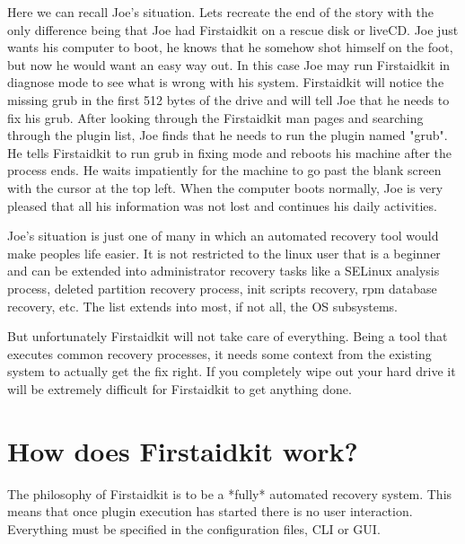 \documentclass[a4paper,13pt]{article}
\begin{document}
Here we can recall Joe's situation.  Lets recreate the end of the story with the only difference being that Joe had Firstaidkit on a rescue disk or liveCD.  Joe just wants his computer to boot, he knows that he somehow shot himself on the foot, but now he would want an easy way out.  In this case Joe may run Firstaidkit in diagnose mode to see what is wrong with his system.  Firstaidkit will notice the missing grub in the first 512 bytes of the drive and will tell Joe that he needs to fix his grub.  After looking through the Firstaidkit man pages and searching through the plugin list, Joe finds that he needs to run the plugin named "grub".  He tells Firstaidkit to run grub in fixing mode and reboots his machine after the process ends.  He waits impatiently for the machine to go past the blank screen with the cursor at the top left.  When the computer boots normally, Joe is very pleased that all his information was not lost and continues his daily activities.

Joe's situation is just one of many in which an automated recovery tool would make peoples life easier.  It is not restricted to the linux user that is a beginner and can be extended into administrator recovery tasks like a SELinux analysis process, deleted partition recovery process, init scripts recovery, rpm database recovery, etc.  The list extends into most, if not all, the OS subsystems.

But unfortunately Firstaidkit will not take care of everything.  Being a tool that executes common recovery processes, it needs some context from the existing system to actually get the fix right.  If you completely wipe out your hard drive it will be extremely difficult for Firstaidkit to get anything done.

\section{How does Firstaidkit work?}
The philosophy of Firstaidkit is to be a *fully* automated recovery system.  This means that once plugin execution has started there is no user interaction.  Everything must be specified in the configuration files, CLI or GUI.
\end{document}
